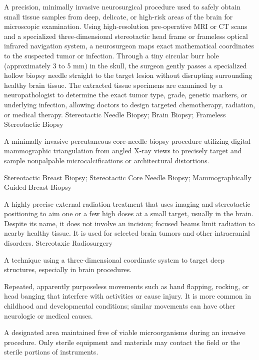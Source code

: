  A precision, minimally invasive neurosurgical procedure used to safely obtain small tissue samples from deep, delicate, or high-risk areas of the brain for microscopic examination. Using high-resolution pre-operative MRI or CT scans and a specialized three-dimensional stereotactic head frame or frameless optical infrared navigation system, a neurosurgeon maps exact mathematical coordinates to the suspected tumor or infection. Through a tiny circular burr hole (approximately 3 to 5 mm) in the skull, the surgeon gently passes a specialized hollow biopsy needle straight to the target lesion without disrupting surrounding healthy brain tissue. The extracted tissue specimens are examined by a neuropathologist to determine the exact tumor type, grade, genetic markers, or underlying infection, allowing doctors to design targeted chemotherapy, radiation, or medical therapy.
\synonyms
Stereotactic Needle Biopsy; Brain Biopsy; Frameless Stereotactic Biopsy

 A minimally invasive percutaneous core-needle biopsy procedure utilizing digital mammographic triangulation from angled X-ray views to precisely target and sample nonpalpable microcalcifications or architectural distortions.

\synonyms
Stereotactic Breast Biopsy; Stereotactic Core Needle Biopsy; Mammographically Guided Breast Biopsy

 A highly precise external radiation treatment that
uses imaging and stereotactic positioning to aim one or a few high doses at a small
target, usually in the brain. Despite its name, it does not involve an incision;
focused beams limit radiation to nearby healthy tissue. It is used for selected
brain tumors and other intracranial disorders.
\synonyms
Stereotaxic Radiosurgery

 A technique using a three-dimensional coordinate system to target deep structures, especially in brain procedures.

 Repeated, apparently purposeless movements such as hand flapping, rocking, or head banging that interfere with activities or cause injury. It is more common in childhood and developmental conditions; similar movements can have other neurologic or medical causes.

 A designated area maintained free of viable microorganisms during an invasive procedure.
Only sterile equipment and materials may contact the field or the sterile portions of
instruments.

